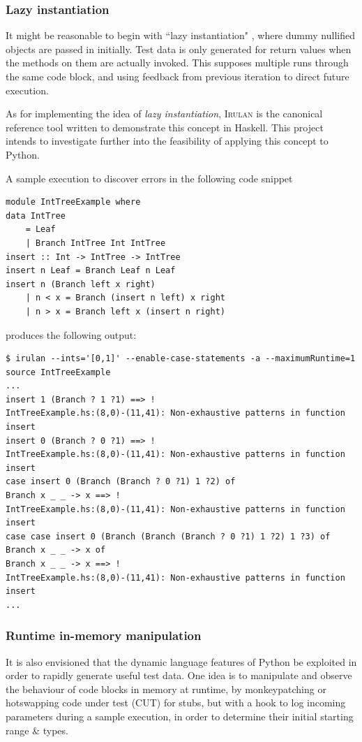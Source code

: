 \documentclass{icldt}
\numberwithin{equation}{section}       %
\begin{document}
{\subsubsection{Lazy instantiation}
It might be reasonable to begin with ``lazy instantiation" \cite{Allwood2011}, where dummy \textsf{null}ified objects are passed in initially. Test data is only generated for return values when the methods on them are actually invoked. This supposes multiple runs through the same code block, and using feedback from previous iteration to direct future execution.

As for implementing the idea of \emph{lazy instantiation}, \textsc{Irulan} \cite{Allwood2011} is the canonical reference tool written to demonstrate this concept in Haskell. This project intends to investigate further into the feasibility of applying this concept to Python.

A sample execution to discover errors in the following code snippet

\begin{lstlisting}[language=HaskellUlisses,frame=single]
module IntTreeExample where
data IntTree
	= Leaf
	| Branch IntTree Int IntTree
insert :: Int -> IntTree -> IntTree
insert n Leaf = Branch Leaf n Leaf
insert n (Branch left x right)
	| n < x = Branch (insert n left) x right
	| n > x = Branch left x (insert n right)
\end{lstlisting}
\clearpage
produces the following output:
\begin{lstlisting}[language=HaskellUlisses,frame=single]
$ irulan --ints='[0,1]' --enable-case-statements -a --maximumRuntime=1 source IntTreeExample
...
insert 1 (Branch ? 1 ?1) ==> !
IntTreeExample.hs:(8,0)-(11,41): Non-exhaustive patterns in function insert
insert 0 (Branch ? 0 ?1) ==> !
IntTreeExample.hs:(8,0)-(11,41): Non-exhaustive patterns in function insert
case insert 0 (Branch (Branch ? 0 ?1) 1 ?2) of
Branch x _ _ -> x ==> !
IntTreeExample.hs:(8,0)-(11,41): Non-exhaustive patterns in function insert
case case insert 0 (Branch (Branch (Branch ? 0 ?1) 1 ?2) 1 ?3) of
Branch x _ _ -> x of
Branch x _ _ -> x ==> !
IntTreeExample.hs:(8,0)-(11,41): Non-exhaustive patterns in function insert
...
\end{lstlisting}

\subsubsection{Runtime in-memory manipulation}
It is also envisioned that the dynamic language features of Python be exploited in order to rapidly generate useful test data. One idea is to manipulate and observe the behaviour of code blocks in memory at runtime, by monkeypatching or hotswapping code under test (CUT) for stubs, but with a hook to log incoming parameters during a sample execution, in order to determine their initial starting range \& types.

}
\end{document}
